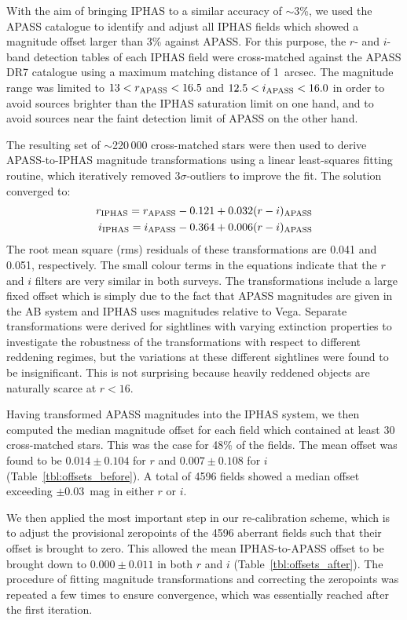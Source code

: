 \documentclass[useAMS,usenatbib]{mn2e}
\begin{document}
With the aim of bringing IPHAS to a similar accuracy of $\sim$3\%,
we used the APASS catalogue to identify and adjust all IPHAS fields 
which showed a magnitude offset larger than 3\% against APASS.
For this purpose,
the $r$- and $i$-band detection tables of each IPHAS field
were cross-matched against the APASS DR7 catalogue 
using a maximum matching distance of 1~arcsec.
The magnitude range was limited to
$13<r_{\rm APASS}<16.5$ and $12.5<i_{\rm APASS}<16.0$
in order to avoid sources 
brighter than the IPHAS saturation limit on one hand, 
and to avoid sources near the faint detection limit of APASS 
on the other hand.

The resulting set of $\sim$220\,000 cross-matched stars were then used 
to derive APASS-to-IPHAS magnitude transformations
using a linear least-squares fitting routine, 
which iteratively removed $3\sigma$-outliers to improve the fit.
The solution converged to:
\begin{align} 
r_{\rm IPHAS} = r_{\rm APASS} - 0.121 + 0.032(r-i)_{\rm APASS} \label{eqn:apass_r} \\
i_{\rm IPHAS} = i_{\rm APASS} - 0.364 + 0.006(r-i)_{\rm APASS} \label{eqn:apass_i}
\end{align}
The root mean square (rms) residuals of these transformations 
are 0.041 and 0.051, respectively.
The small colour terms in the equations
indicate that the $r$ and $i$ filters 
are very similar in both surveys.
The transformations include a large fixed offset
which is simply due to the fact that 
APASS magnitudes are given in the AB system
and IPHAS uses magnitudes relative to Vega.
Separate transformations were derived for sightlines 
with varying extinction properties to investigate the robustness
of the transformations with respect to different reddening regimes,
but the variations at these different
sightlines were found to be insignificant.
This is not surprising because heavily reddened objects 
are naturally scarce at $r<16$.

Having transformed APASS magnitudes into the IPHAS system,
we then computed the median magnitude offset 
for each field which contained at least 30 cross-matched stars.
This was the case for 48\% of the fields.
The mean offset was found to be
$0.014\pm0.104$ for $r$ and $0.007\pm0.108$ for $i$
(Table~\ref{tbl:offsets_before}).
A total of 4596 fields showed a median offset
exceeding $\pm$0.03~mag in either $r$ or $i$.

We then applied the most important step in our re-calibration scheme,
which is to adjust the provisional zeropoints of the 4596 aberrant fields
such that their offset is brought to zero.
This allowed the mean IPHAS-to-APASS offset 
to be brought down to $0.000\pm0.011$ in both $r$ and $i$
(Table~\ref{tbl:offsets_after}).
The procedure of fitting magnitude transformations and
correcting the zeropoints was repeated a few times to ensure 
convergence, which was essentially reached after the first iteration.
\end{document}
